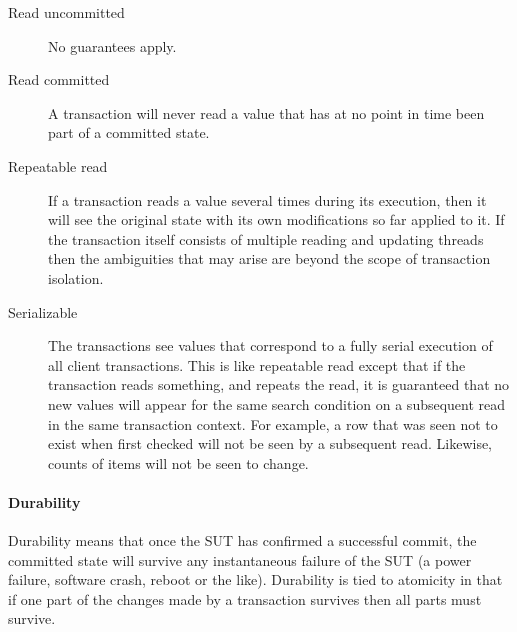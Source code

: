 \begin{description}
\item[Read uncommitted] No guarantees apply.
\item[Read committed] A transaction will never read a value that has at no point in time been part of a
    committed state.
\item[Repeatable read] If a transaction reads a value several times during its execution, then it will see
    the original state with its own modifications so far applied to it. If the transaction itself consists of
    multiple reading and updating threads then the ambiguities that may arise are beyond the scope of transaction isolation.
\item[Serializable] The transactions see values that correspond to a fully serial execution of
    all client transactions. This is like repeatable read except that if the transaction reads something, and
    repeats the read, it is guaranteed that no new values will appear for the same search condition on a
    subsequent read in the same transaction context. For example, a row that was seen not to exist when
    first checked will not be seen by a subsequent read. Likewise, counts of items will not be seen to
    change.
\end{description}

\paragraph{Durability}
Durability means that once the SUT has confirmed a successful commit, the committed state
will survive any instantaneous failure of the SUT (\eg a power failure, software crash, reboot or
the like). Durability is tied to atomicity in that if one part of the changes made by a transaction survives then
all parts must survive. %



